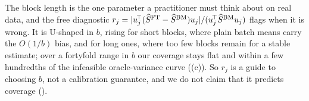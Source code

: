 The block length is the one parameter a practitioner must think about on real data, and the free
diagnostic $r_j=|u_j^{\!\top}(\widehat{S}^{\mathrm{FT}}-\widehat{S}^{\mathrm{BM}})u_j|/(u_j^{\!\top}\widehat{S}^{\mathrm{BM}} u_j)$ flags when it is wrong. It is
U-shaped in $b$, rising for short blocks, where plain batch means carry the $O(1/b)$ bias, and for long
ones, where too few blocks remain for a stable estimate; over a fortyfold range in $b$ our coverage
stays flat and within a few hundredths of the infeasible oracle-variance curve ((c)). So
$r_j$ is a guide to choosing $b$, not a calibration guarantee, and we do not claim that it predicts
coverage ().
